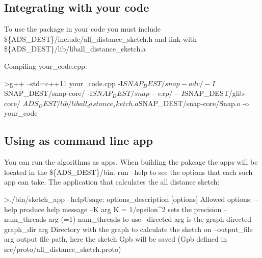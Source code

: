 \subsection*{Integrating with your code}

To use the package in your code you must include \$\{A\+D\+S\+\_\+\+D\+E\+S\+T\}/include/all\+\_\+distance\+\_\+sketch.h and link with \$\{A\+D\+S\+\_\+\+D\+E\+S\+T\}/lib/liball\+\_\+distance\+\_\+sketch.a

Compiling your\+\_\+code.\+cpp\+:

\begin{DoxyVerb}>g++ --std=c++11  your_code.cpp -I${SNAP_DEST}/snap-adv/ -I${SNAP_DEST}/snap-core/ -I${SNAP_DEST}/snap-exp/ -I${SNAP_DEST}/glib-core/  ${ADS_DEST}/lib/liball_distance_sketch.a ${SNAP_DEST}/snap-core/Snap.o  -o your_code
\end{DoxyVerb}


\subsection*{Using as command line app}

You can run the algorithms as apps. When building the pakcage the apps will be located in the \$\{A\+D\+S\+\_\+\+D\+E\+S\+T\}/bin. run --help to see the options that each such app can take. The application that calculates the all distance sketch\+: \begin{DoxyVerb}>./bin/sketch_app --helpUsage: options_description [options]
Allowed options:
  --help                 produce help message
  --K arg                K = 1/epsilon^2 sets the precision
  --num_threads arg (=1) num_threads to use
  --directed arg         is the graph directed
  --graph_dir arg        Directory with the graph to calculate the sketch on
  --output_file arg      output file path, here the sketch Gpb will be saved 
                         (Gpb defined in src/proto/all_distance_sketch.proto)\end{DoxyVerb}
 